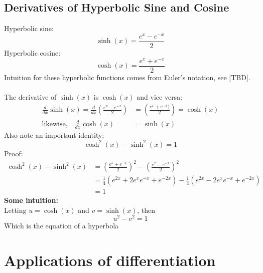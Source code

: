 \documentclass{report}
\begin{document}
\subsection{Derivatives of Hyperbolic Sine and Cosine}
Hyperbolic sine:
\begin{equation*}
\sinh(x)=\frac{e^x-e^{-x}}{2}
\end{equation*}
Hyperbolic cosine:
\begin{equation*}
\cosh(x)=\frac{e^x+e^{-x}}{2}
\end{equation*}
Intuition for these hyperbolic functions comes from Euler's notation,
see [TBD].\\
\vspace{1mm}\\
The derivative of $\sinh(x)$ is $\cosh(x)$ and vice versa:
\begin{align*}
\frac{d}{dx}\sinh(x)=\frac{d}{dx}\left(\frac{e^x-e^{-x}}{2}\right)
&=\left(\frac{e^x+e^{-x})}{2}\right)=\cosh(x)\\
\text{likewise,}\quad\frac{d}{dx}\cosh(x)&=\sinh(x)
\end{align*}
Also note an important identity:
\begin{equation*}
\cosh^2(x)-\sinh^2(x)=1
\end{equation*}
Proof:
\begin{align*}
\cosh^2(x)-\sinh^2(x)&=\left(\frac{e^x+e^{-x}}{2}\right)^2
-\left(\frac{e^x-e^{-x}}{2}\right)^2\\
&=\frac{1}{4}(e^{2x}+2e^xe^{-x}+e^{-2x})
-\frac{1}{4}(e^{2x}-2e^xe^{-x}+e^{-2x})\\
&=1
\end{align*}
\textbf{Some intuition:}\\
Letting $u=\cosh(x)$ and $v=\sinh(x)$, then
\begin{equation*}
u^2-v^2=1
\end{equation*}
Which is the equation of a hyperbola
\newpage


\section{Applications of differentiation}
\end{document}
